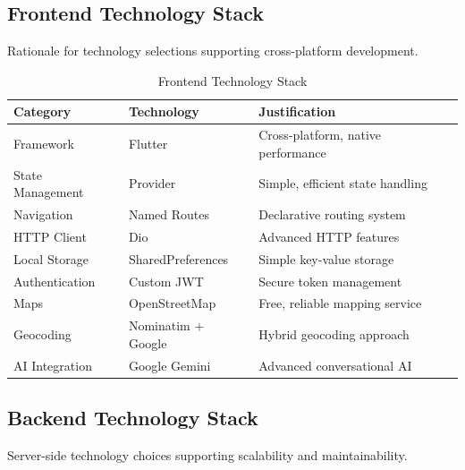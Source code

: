 \subsection{Frontend Technology Stack}

Rationale for technology selections supporting cross-platform development.

\begin{table}[h!]
    \centering
    \caption{Frontend Technology Stack}
    \label{tab:frontend_stack}
    \begin{tabular}{lll}     
        \toprule
        Category & Technology & Justification \\
        \midrule
        Framework & Flutter & Cross-platform, native performance \\
        State Management & Provider & Simple, efficient state handling \\
        Navigation & Named Routes & Declarative routing system \\
        HTTP Client & Dio & Advanced HTTP features \\
        Local Storage & SharedPreferences & Simple key-value storage \\
        Authentication & Custom JWT & Secure token management \\
        Maps & OpenStreetMap & Free, reliable mapping service \\
        Geocoding & Nominatim + Google & Hybrid geocoding approach \\
        AI Integration & Google Gemini & Advanced conversational AI \\
        \bottomrule
    \end{tabular}
\end{table}
\clearpage
\subsection{Backend Technology Stack}

Server-side technology choices supporting scalability and maintainability.

